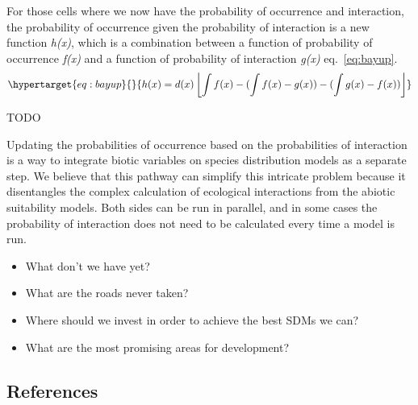 \documentclass[12pt]{article}
\begin{document}
For those cells where we now have the probability of occurrence and
interaction, the probability of occurrence given the probability of
interaction is a new function \emph{h(x)}, which is a combination
between a function of probability of occurrence \emph{f(x)} and a
function of probability of interaction \emph{g(x)} eq.~\ref{eq:bayup}.\\
\begin{equation}\protect\hypertarget{eq:bayup}{}{h(x) = d(x)\left \lfloor \int f(x)-(\int f(x)-g(x))-(\int g(x)-f(x)) \right \rfloor}\label{eq:bayup}\end{equation}

TODO

Updating the probabilities of occurrence based on the probabilities of
interaction is a way to integrate biotic variables on species
distribution models as a separate step. We believe that this pathway can
simplify this intricate problem because it disentangles the complex
calculation of ecological interactions from the abiotic suitability
models. Both sides can be run in parallel, and in some cases the
probability of interaction does not need to be calculated every time a
model is run.

\begin{itemize}
\tightlist
\item
  What don't we have yet?
\item
  What are the roads never taken?
\item
  Where should we invest in order to achieve the best SDMs we can?
\item
  What are the most promising areas for development?
\end{itemize}

\hypertarget{references}{%
\subsection*{References}\label{references}}
\end{document}

